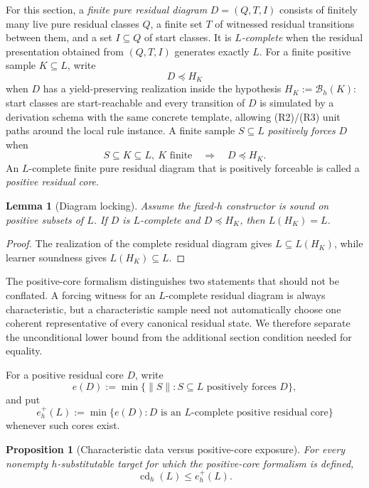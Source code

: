 \documentclass[11pt]{article}
\newtheorem{lemma}[definition]{Lemma}
\newtheorem{proposition}[definition]{Proposition}
\newcommand{\cd}{\operatorname{cd}}
\newcommand{\B}{\mathcal B}
\begin{document}
For this section, a \emph{finite pure residual diagram}
$D=(Q,T,I)$ consists of finitely many live pure residual classes $Q$, a finite
set $T$ of witnessed residual transitions between them, and a set $I\subseteq Q$
of start classes.  It is \emph{$L$-complete} when the residual presentation
obtained from $(Q,T,I)$ generates exactly $L$.  For a finite positive sample
$K\subseteq L$, write
\[
  D\preceq H_K
\]
when $D$ has a yield-preserving realization inside the hypothesis
$H_K:=\B_h(K)$: start classes are start-reachable and every transition of $D$
is simulated by a derivation schema with the same concrete template, allowing
(R2)/(R3) unit paths around the local rule instance.  A finite sample
$S\subseteq L$ \emph{positively forces} $D$ when
\[
  S\subseteq K\subseteq L,\ K\text{ finite}
  \quad\Longrightarrow\quad D\preceq H_K.
\]
An $L$-complete finite pure residual diagram that is positively forceable is
called a \emph{positive residual core}.

\begin{lemma}[Diagram locking]
\label{lem:diagram-locking}
Assume the fixed-$h$ constructor is sound on positive subsets of $L$.  If
$D$ is $L$-complete and $D\preceq H_K$, then $L(H_K)=L$.
\end{lemma}
\begin{proof}
The realization of the complete residual diagram gives
$L\subseteq L(H_K)$, while learner soundness gives
$L(H_K)\subseteq L$.
\end{proof}

The positive-core formalism distinguishes two statements that should not be
conflated.  A forcing witness for an $L$-complete residual diagram is always
characteristic, but a characteristic sample need not automatically choose one
coherent representative of every canonical residual state.  We therefore
separate the unconditional lower bound from the additional section condition
needed for equality.

For a positive residual core $D$, write
\[
 e(D):=\min\{\|S\|:S\subseteq L\text{ positively forces }D\},
\]
and put
\[
 e_h^+(L):=\min\{e(D):D\text{ is an $L$-complete positive residual core}\}
\]
whenever such cores exist.

\begin{proposition}[Characteristic data versus positive-core exposure]
\label{prop:core-lower}
For every nonempty $h$-substitutable target for which the positive-core
formalism is defined,
\[
 \boxed{\cd_h(L)\le e_h^+(L).}
\]
\end{proposition}
\end{document}
